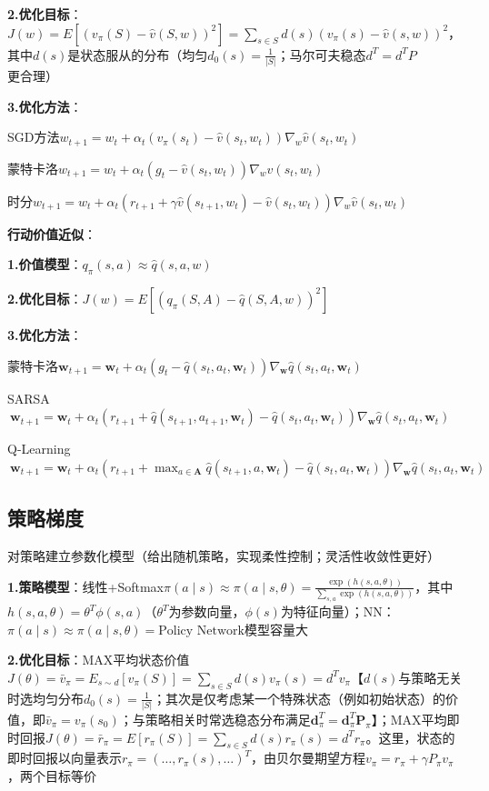 	\textbf{2.优化目标}：$J(w)=E\left[\left(v_{\pi}(S)-\hat{v}(S, w)\right)^2\right]=\sum_{s\in S} d(s)\left(v_{\pi}(s)-\hat{v}(s, w)\right)^2$，其中$d(s)$是状态服从的分布（均匀$d_0(s)=\frac{1}{|S|}$；马尔可夫稳态$d^T=d^T P$更合理）
	
	\textbf{3.优化方法}：
	
	SGD方法$w_{t+1}=w_t+\alpha_t\left(v_{\pi}\left(s_t\right)-\hat{v}\left(s_t, w_t\right)\right)\nabla_{w} \hat{v}\left(s_t, w_t\right)$
	
	蒙特卡洛$w_{t+1}=w_t+\alpha_t\left(g_t-\hat{v}\left(s_t, w_t\right)\right)\nabla_{w} \hat{v}\left(s_t, w_t\right)$
	
	时分$w_{t+1}=w_t+\alpha_t\left(r_{t+1}+\gamma\hat{v}\left(s_{t+1}, w_t\right)-\hat{v}\left(s_t, w_t\right)\right)\nabla_{w} \hat{v}\left(s_t, w_t\right)$
	
	\textbf{行动价值近似}：
	
	\textbf{1.价值模型}：$q_\pi(s, a)\approx\hat{q}(s, a, w)$
	
	\textbf{2.优化目标}：$J(w)=E\left[\left(q_\pi(S, A)-\hat{q}(S, A, w)\right)^2\right]$
	
	\textbf{3.优化方法}：
	
	蒙特卡洛$\mathbf{w}_{t+1} = \mathbf{w}_t + \alpha_t(g_t - \hat{q}(s_t,a_t,\mathbf{w}_t))\nabla_{\mathbf{w}}\hat{q}(s_t,a_t,\mathbf{w}_t)$
	
	SARSA$~\mathbf{w}_{t+1} = \mathbf{w}_t + \alpha_t(r_{t+1} + \hat{q}(s_{t+1},a_{t+1},\mathbf{w}_t) - \hat{q}(s_t,a_t,\mathbf{w}_t))\nabla_{\mathbf{w}}\hat{q}(s_t,a_t,\mathbf{w}_t)$
	
	Q-Learning$~\mathbf{w}_{t+1} = \mathbf{w}_t + \alpha_t(r_{t+1} + \max_{a\in\mathbf{A}}\hat{q}(s_{t+1},a,\mathbf{w}_t) - \hat{q}(s_t,a_t,\mathbf{w}_t))\nabla_{\mathbf{w}}\hat{q}(s_t,a_t,\mathbf{w}_t)$
	
	\subsection*{策略梯度}
	对策略建立参数化模型（给出随机策略，实现柔性控制；灵活性收敛性更好）
	
	\textbf{1.策略模型}：线性+Softmax$\pi(a\mid s)\approx\pi(a\mid s,\theta)=\frac{\exp(h(s, a,\theta))}{\sum_{s, a}\exp(h(s, a,\theta))}$，其中$h(s, a,\theta)=\theta^T\phi(s, a)$（$\theta^T$为参数向量，$\phi(s)$为特征向量）；NN：$\pi(a\mid s)\approx\pi(a\mid s,\theta)=\text{Policy Network}$模型容量大
	
	\textbf{2.优化目标}：MAX平均状态价值$J(\theta)=\bar{v}_{\pi}=E_{s\sim d}\left[v_{\pi}(S)\right]=\sum_{s\in S} d(s) v_{\pi}(s)=d^T v_{\pi}$【$d(s)$与策略无关时选均匀分布$d_0(s)=\frac{1}{|S|}$；其次是仅考虑某一个特殊状态（例如初始状态）的价值，即$\bar{v}_\pi=v_\pi\left(s_0\right)$；与策略相关时常选稳态分布满足$\mathbf{d}_\pi^T=\mathbf{d}_\pi^T \mathbf{P}_\pi$】；MAX平均即时回报$J(\theta)=\bar{r}_\pi=E\left[r_\pi(S)\right]=\sum_{s\in S} d(s) r_\pi(s)=d^T r_\pi$。这里，状态的即时回报以向量表示$r_\pi=\left(\ldots, r_\pi(s),\ldots\right)^T$，由贝尔曼期望方程$v_{\pi}=r_{\pi}+\gamma P_{\pi} v_{\pi}$，两个目标等价
	
